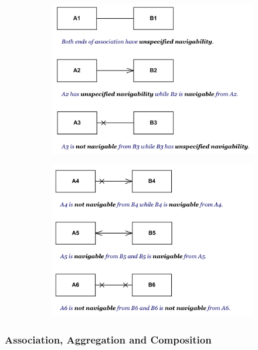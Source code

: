 \documentclass[../main/main.tex]{subfiles}
\begin{document}
\begin{figure}[h!]
  \centering
  \begin{subfigure}[b]{0.48\textwidth}
    \includegraphics[width=\textwidth]{../figures/umlnav1.png}
  \end{subfigure}
  \begin{subfigure}[b]{0.48\textwidth}
    \includegraphics[width=\textwidth]{../figures/umlnav2.png}
  \end{subfigure}
  \caption{\cite{umldiagrams:navigability}}
  \label{fig:umlnav}
\end{figure}

\subsubsection{Association, Aggregation and Composition}
\end{document}
